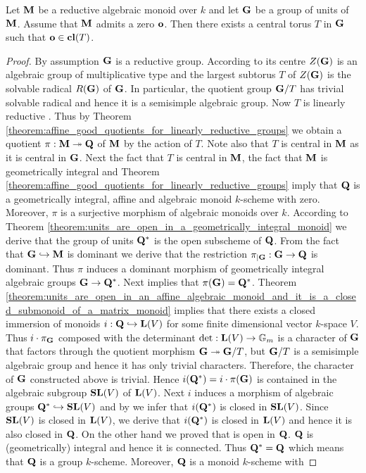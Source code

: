 \begin{theorem}\label{theorem:reductive_monoids_are_Kempf}
Let $\mathbf{M}$ be a reductive algebraic monoid over $k$ and let $\mathbf{G}$ be a group of units of $\mathbf{M}$. Assume that $\mathbf{M}$ admits a zero $\mathbf{o}$. Then there exists a central torus $T$ in $\mathbf{G}$ such that $\mathbf{o}\in \mathbf{cl}(T)$.
\end{theorem}
\begin{proof}
By assumption $\mathbf{G}$ is a reductive group. According to {\cite[Corollary 17.62 and Notation 12.29]{milne2017algebraic}} its centre $Z(\mathbf{G})$ is an algebraic group of multiplicative type and the largest subtorus $T$ of $Z(\mathbf{G})$ is the solvable radical $R(\mathbf{G})$ of $\mathbf{G}$. In particular, the quotient group $\mathbf{G}/T$ has trivial solvable radical and hence it is a semisimple algebraic group. Now $T$ is linearly reductive {\cite[Corollary 10.4]{Group_schemes_over_field}}. Thus by Theorem \ref{theorem:affine_good_quotients_for_linearly_reductive_groups} we obtain a quotient $\pi:\mathbf{M}\twoheadrightarrow \mathbf{Q}$ of $\mathbf{M}$ by the action of $T$. Note also that $T$ is central in $\mathbf{M}$ as it is central in $\mathbf{G}$. Next the fact that $T$ is central in $\mathbf{M}$, the fact that $\mathbf{M}$ is geometrically integral and Theorem \ref{theorem:affine_good_quotients_for_linearly_reductive_groups} imply that $\mathbf{Q}$ is a geometrically integral, affine and algebraic monoid $k$-scheme with zero. Moreover, $\pi$ is a surjective morphism of algebraic monoids over $k$. According to Theorem \ref{theorem:units_are_open_in_a_geometrically_integral_monoid} we derive that the group of units $\mathbf{Q}^*$ is the open subscheme of $\mathbf{Q}$. From the fact that $\mathbf{G}\hookrightarrow \mathbf{M}$ is dominant we derive that the restriction $\pi_{\mid \mathbf{G}}:\mathbf{G}\rightarrow \mathbf{Q}$ is dominant. Thus $\pi$ induces a dominant morphism of geometrically integral algebraic groups $\mathbf{G}\rightarrow \mathbf{Q}^*$. Next {\cite[Theorem 5.3]{Group_schemes_over_field}} implies that $\pi(\mathbf{G}) = \mathbf{Q}^*$. Theorem \ref{theorem:units_are_open_in_an_affine_algebraic_monoid_and_it_is_a_closed_submonoid_of_a_matrix_monoid} implies that there exists a closed immersion of monoids $i:\mathbf{Q} \hookrightarrow \mathbf{L}(V)$ for some finite dimensional vector $k$-space $V$. Thus $i\cdot \pi_{\mathbf{G}}$ composed with the determinant $\mathrm{det}:\mathbf{L}(V) \rightarrow \mathbb{G}_{m}$ is a character of $\mathbf{G}$ that factors through the quotient morphism $\mathbf{G}\twoheadrightarrow \mathbf{G}/T$, but $\mathbf{G}/T$ is a semisimple algebraic group and hence it has only trivial characters. Therefore, the character of $\mathbf{G}$ constructed above is trivial. Hence $i(\mathbf{Q}^*) = i\cdot \pi(\mathbf{G})$ is contained in the algebraic subgroup $\mathbf{SL}(V)$ of $\mathbf{L}(V)$. Next $i$ induces a morphism of algebraic groups $\mathbf{Q}^*\hookrightarrow \mathbf{SL}(V)$ and by {\cite[Theorem 5.3]{Group_schemes_over_field}} we infer that $i(\mathbf{Q}^*)$ is closed in $\mathbf{SL}(V)$. Since $\mathbf{SL}(V)$ is closed in $\mathbf{L}(V)$, we derive that $i(\mathbf{Q}^*)$ is closed in $\mathbf{L}(V)$ and hence it is also closed in $\mathbf{Q}$. On the other hand we proved that is open in $\mathbf{Q}$. $\mathbf{Q}$ is (geometrically) integral and hence it is connected. Thus $\mathbf{Q}^* = \mathbf{Q}$ which means that $\mathbf{Q}$ is a group $k$-scheme. Moreover, $\mathbf{Q}$ is a monoid $k$-scheme with 
\end{proof}
